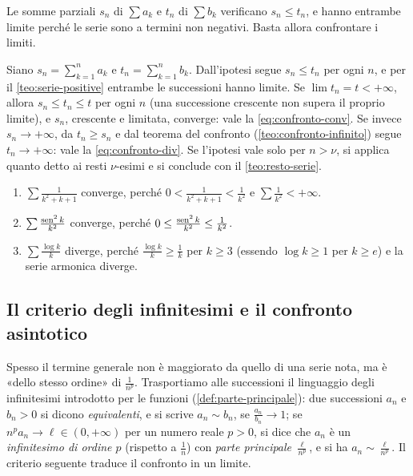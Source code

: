 \begin{strategia}
Le somme parziali $s_{n}$ di $\sum a_{k}$ e $t_{n}$ di $\sum b_{k}$ verificano $s_{n}\le t_{n}$, e hanno
entrambe limite perché le serie sono a termini non negativi. Basta allora confrontare i
limiti.
\end{strategia}

\begin{dimostrazione}
Siano $s_{n}=\sum_{k=1}^{n}a_{k}$ e $t_{n}=\sum_{k=1}^{n}b_{k}$. Dall'ipotesi segue $s_{n}\le t_{n}$ per ogni $n$,
e per il \cref{teo:serie-positive} entrambe le successioni hanno limite. Se
$\lim t_{n}=t<+\infty$, allora $s_{n}\le t_{n}\le t$ per ogni $n$ (una successione crescente non
supera il proprio limite), e $s_{n}$, crescente e limitata, converge: vale la
\eqref{eq:confronto-conv}. Se invece $s_{n}\to+\infty$, da $t_{n}\ge s_{n}$ e dal teorema del
confronto (\cref{teo:confronto-infinito}) segue $t_{n}\to+\infty$: vale la
\eqref{eq:confronto-div}. Se l'ipotesi vale solo per $n>\nu$, si applica quanto detto ai
resti $\nu$-esimi e si conclude con il \cref{teo:resto-serie}.
\end{dimostrazione}

\begin{esempio}\label{es:confronto}
\begin{enumerate}[label=(\alph*)]
  \item $\sum\frac1{k^{2}+k+1}$ converge, perché $0<\frac1{k^{2}+k+1}<\frac1{k^{2}}$ e $\sum\frac1{k^{2}}<+\infty$.
  \item $\sum\frac{\operatorname{sen}^{2}k}{k^{2}}$ converge, perché $0\le\frac{\operatorname{sen}^{2}k}{k^{2}}\le\frac1{k^{2}}$.
  \item $\sum\frac{\log k}k$ diverge, perché $\frac{\log k}k\ge\frac1k$ per $k\ge3$ (essendo $\log k\ge1$
  per $k\ge e$) e la serie armonica diverge.
\end{enumerate}
\end{esempio}

\subsection{Il criterio degli infinitesimi e il confronto asintotico}

Spesso il termine generale non è maggiorato da quello di una serie nota, ma è
«dello stesso ordine» di $\frac1{n^{p}}$. Trasportiamo alle successioni il linguaggio degli
infinitesimi introdotto per le funzioni (\cref{def:parte-principale}): due successioni
$a_{n}$ e $b_{n}>0$ si dicono \emph{equivalenti}, e si scrive $a_{n}\sim b_{n}$, se $\frac{a_{n}}{b_{n}}\to1$; se
$n^{p}a_{n}\to\ell\in(0,+\infty)$ per un numero reale $p>0$, si dice che $a_{n}$ è un \emph{infinitesimo di
ordine $p$} (rispetto a $\frac1n$) con \emph{parte principale} $\frac\ell{n^{p}}$, e si ha $a_{n}\sim\frac\ell{n^{p}}$. Il
criterio seguente traduce il confronto in un limite.

